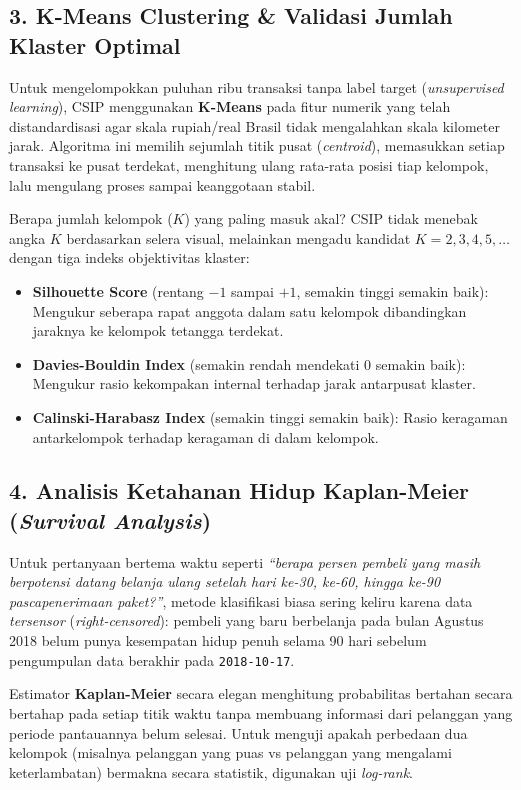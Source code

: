 \documentclass[11pt,a4paper,oneside]{book}
\newcommand{\code}[1]{{\small\nolinkurl{#1}}}
\begin{document}
\subsection{3. K-Means Clustering \& Validasi Jumlah Klaster Optimal}
Untuk mengelompokkan puluhan ribu transaksi tanpa label target (\emph{unsupervised learning}), CSIP menggunakan \textbf{K-Means} pada fitur numerik yang telah distandardisasi agar skala rupiah/real Brasil tidak mengalahkan skala kilometer jarak. Algoritma ini memilih sejumlah titik pusat (\emph{centroid}), memasukkan setiap transaksi ke pusat terdekat, menghitung ulang rata-rata posisi tiap kelompok, lalu mengulang proses sampai keanggotaan stabil.

Berapa jumlah kelompok ($K$) yang paling masuk akal? CSIP tidak menebak angka $K$ berdasarkan selera visual, melainkan mengadu kandidat $K=2, 3, 4, 5, \dots$ dengan tiga indeks objektivitas klaster:
\begin{itemize}
  \item \textbf{Silhouette Score} (rentang $-1$ sampai $+1$, semakin tinggi semakin baik): Mengukur seberapa rapat anggota dalam satu kelompok dibandingkan jaraknya ke kelompok tetangga terdekat.
  \item \textbf{Davies-Bouldin Index} (semakin rendah mendekati $0$ semakin baik): Mengukur rasio kekompakan internal terhadap jarak antarpusat klaster.
  \item \textbf{Calinski-Harabasz Index} (semakin tinggi semakin baik): Rasio keragaman antarkelompok terhadap keragaman di dalam kelompok.
\end{itemize}

\subsection{4. Analisis Ketahanan Hidup Kaplan-Meier (\emph{Survival Analysis})}
Untuk pertanyaan bertema waktu seperti \emph{``berapa persen pembeli yang masih berpotensi datang belanja ulang setelah hari ke-30, ke-60, hingga ke-90 pascapenerimaan paket?''}, metode klasifikasi biasa sering keliru karena data \emph{tersensor} (\emph{right-censored}): pembeli yang baru berbelanja pada bulan Agustus 2018 belum punya kesempatan hidup penuh selama 90 hari sebelum pengumpulan data berakhir pada \code{2018-10-17}.

Estimator \textbf{Kaplan-Meier} secara elegan menghitung probabilitas bertahan secara bertahap pada setiap titik waktu tanpa membuang informasi dari pelanggan yang periode pantauannya belum selesai. Untuk menguji apakah perbedaan dua kelompok (misalnya pelanggan yang puas vs pelanggan yang mengalami keterlambatan) bermakna secara statistik, digunakan uji \emph{log-rank}.
\end{document}
